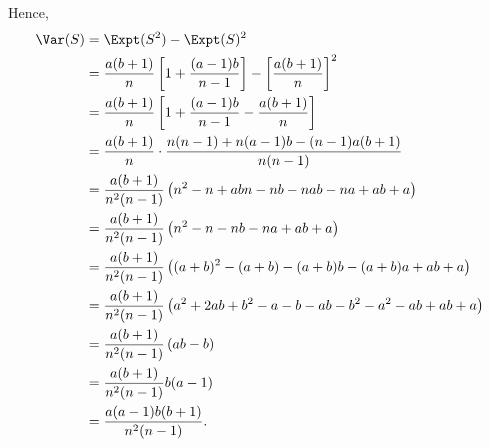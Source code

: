 \begin{enumerate}
\begin{enumerate}
                    Hence,
                    \begin{align*}
                        \Var(S) & = \Expt(S^2) - \Expt(S)^2                                                                          \\
                                & = \frac{a(b + 1)}{n} \left[1 + \frac{(a - 1) b}{n - 1}\right] - \left[\frac{a (b + 1)}{n}\right]^2 \\
                                & = \frac{a(b + 1)}{n} \left[1 + \frac{(a - 1) b}{n - 1} - \frac{a (b + 1)}{n}\right]                \\
                                & = \frac{a(b + 1)}{n} \cdot \frac{n (n - 1) + n (a - 1) b - (n - 1) a (b + 1)}{n (n - 1)}           \\
                                & = \frac{a(b + 1)}{n^2 (n - 1)} \left(n^2 - n + abn - nb - nab - na + ab + a\right)                 \\
                                & = \frac{a(b + 1)}{n^2 (n - 1)} \left(n^2 - n - nb - na + ab + a\right)                             \\
                                & = \frac{a(b + 1)}{n^2 (n - 1)} \left((a + b)^2 - (a + b) - (a + b) b - (a + b) a + ab + a\right)   \\
                                & = \frac{a(b + 1)}{n^2 (n - 1)} \left(a^2 + 2ab + b^2 - a - b - ab - b^2 - a^2 - ab + ab + a\right) \\
                                & = \frac{a(b + 1)}{n^2 (n - 1)} \left(ab - b\right)                                                 \\
                                & = \frac{a(b + 1)}{n^2 (n - 1)} b (a - 1)                                                           \\
                                & = \frac{a (a - 1) b (b + 1)}{n^2 (n - 1)}.
                    \end{align*}
          \end{enumerate}
\end{enumerate}